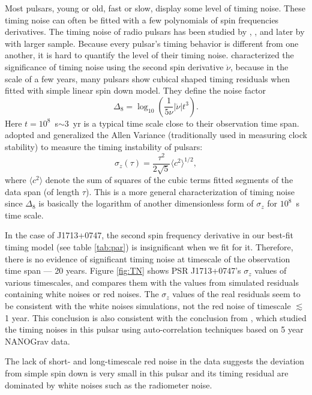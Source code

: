 Most pulsars, young or old, fast or slow, display some level of timing noise.
These timing noise can often be fitted with a few polynomials of spin frequencies derivatives.
The timing noise of radio pulsars has been studied by \citet{antt94},
\citet{dmhd95}, \citet{mtem97} and later by \citet{hlk10} with larger sample. 
Because every pulsar's timing behavior is different from one another, it is
hard to quantify the level of their timing noise.
\citet{antt94} characterized the significance of timing noise using the second
spin derivative $\ddot{\nu}$, because in the scale of a few years, many
pulsars show cubical shaped timing residuals when fitted with simple linear
spin down model.
They define the noise factor 
\begin{equation}
\label{eq:delta8}
\Delta_8 = \log_{10}\left(\frac{1}{5\nu}|\ddot{\nu}|t^3\right).
\end{equation}
Here $t=10^8$~s$\sim 3$~yr is a typical time scale close to their
observation time span.
\citet{mtem97} adopted and generalized the Allen Variance (traditionally used in measuring clock stability) to measure the timing instability of pulsars:
\begin{equation}
\label{eq:sigmaz}
\sigma_z(\tau) = \frac{\tau^2}{2\sqrt{5}}\langle c^2 \rangle^{1/2},
\end{equation}
where $\langle c^2\rangle$ denote the sum of squares of the cubic terms fitted segments of
the data span (of length $\tau$).
This is a more general characterization of timing noise since $\Delta_8$ is
basically the logarithm of another dimensionless form of $\sigma_z$ for
$10^8$~s time scale.

In the case of J1713+0747, the second spin frequency derivative in our
best-fit timing model (see table \ref{tab:par}) is insignificant when we
fit for it. Therefore, there is no evidence of significant timing noise at
timescale of the observation time span --- 20 years. Figure \ref{fig:TN} shows
PSR J1713+0747's $\sigma_z$ values of various timescales, and compares them
with the values from simulated residuals containing white noises or
red noises. The $\sigma_z$ values of the real residuals seem to be consistent 
with the white noises simulations, not the red noise of timescale 
$\lesssim$1 year. This
conclusion is also consistent with the conclusion from \citet{pjl+13}, which 
studied the timing noises in this pulsar using auto-correlation techniques 
based on 5 year NANOGrav data.

The lack of short- and long-timescale red noise in the data suggests the deviation from simple spin down is very small in this pulsar and its timing residual are dominated by white noises such as the radiometer noise.


